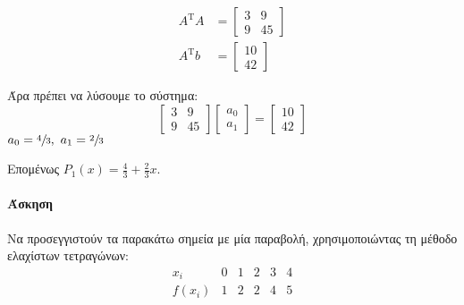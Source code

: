 \documentclass[11pt,a4paper,notitlepage,fleqn,draft]{article}
\begin{document}
    \begin{align*}
    	A^{\mathrm T} A &= \left[\begin{matrix}
    	3 & 9 \\ 9 & 45
    	\end{matrix} \right] \\
    	A^{\mathrm T} b &= \left[ \begin{matrix}
    	10 \\ 42
    	\end{matrix} \right]
    \end{align*}
    
    Άρα πρέπει να λύσουμε το σύστημα:
    \[
    \left[\begin{matrix}
    3 & 9 \\ 9 & 45
    \end{matrix}\right] \left[\begin{matrix}
    a_0 \\ a_1
    \end{matrix}\right] = \left[\begin{matrix}
    10 \\ 42
    \end{matrix}\right]
    \]
    \( a_0 = \sfrac{4}{3},\ a_1 = \sfrac{2}{3}  \)
    
    Επομένως \( \displaystyle P_1(x) = \frac{4}{3} + \frac{2}{3}x \).
    
    \paragraph{Άσκηση}
    Να προσεγγιστούν τα παρακάτω σημεία με μία παραβολή, χρησιμοποιώντας
    τη μέθοδο ελαχίστων τετραγώνων:
    \[
    \begin{array}{r|ccccc}
    x_i & 0 & 1 & 2 & 3 & 4 \\ \hline
    f(x_i) & 1 & 2 & 2 & 4 & 5
    \end{array}
    \]
    
\end{document}
